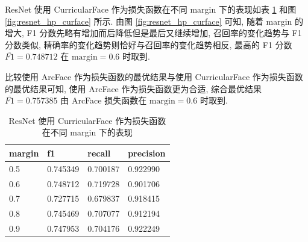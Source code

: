 \documentclass[12pt]{article}
\begin{document}
ResNet 使用 CurricularFace 作为损失函数在不同 margin 下的表现如表 \ref{tab:resnet_hp_curface} 和图 \ref{fig:resnet_hp_curface} 所示. 由图 \ref{fig:resnet_hp_curface} 可知, 随着 margin 的增大, F1 分数先略有增加而后降低但是最后又继续增加, 召回率的变化趋势与 F1 分数类似, 精确率的变化趋势则恰好与召回率的变化趋势相反, 最高的 F1 分数 $\overline{F1}=0.748712$ 在 $\text{margin} = 0.6$ 时取到.

比较使用 ArcFace 作为损失函数的最优结果与使用 CurricularFace 作为损失函数的最优结果可知, 使用 ArcFace 作为损失函数更为合适, 综合最优结果 $\overline{F1}=0.757385$ 由 ArcFace 损失函数在 $\text{margin} = 0.6$ 时取到.

\begin{table}[htbp]
  \centering
  \caption{ResNet 使用 CurricularFace 作为损失函数在不同 margin 下的表现}
  \label{tab:resnet_hp_curface}
  \begin{tabular}{llll}
    \toprule
    margin & f1       & recall   & precision \\
    \midrule
    0.5 & 0.745349 & 0.700187 & 0.922990  \\
    0.6 & 0.748712 & 0.719728 & 0.901706  \\
    0.7 & 0.727715 & 0.679837 & 0.918415  \\
    0.8 & 0.745469 & 0.707077 & 0.912194  \\
    0.9 & 0.747953 & 0.704176 & 0.922249 \\
    \bottomrule
  \end{tabular}
\end{table}
\end{document}
